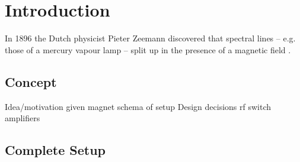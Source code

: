 \setchapterpreamble[u]{\margintoc}
\chapter{Introduction}


In 1896 the Dutch physicist Pieter Zeemann discovered that spectral lines -- e.g. those of a mercury vapour lamp -- split up in the presence of a magnetic field .






\section{Concept}
Idea/motivation
given magnet
schema of setup
Design decisions
rf switch
amplifiers

\section{Complete Setup}

